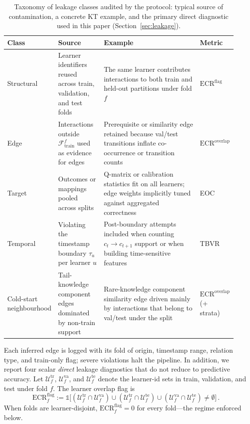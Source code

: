 \documentclass[runningheads]{llncs}
\newcommand{\KC}{knowledge component}
\begin{document}
\begin{table}[!t]
\centering
\caption{Taxonomy of leakage classes audited by the protocol: typical
source of contamination, a concrete KT example, and the primary
direct diagnostic used in this paper (Section~\ref{sec:leakage}).}
\label{tab:leakage-taxonomy}
\footnotesize
\setlength{\tabcolsep}{4pt}
\begin{tabular}{@{}p{0.14\linewidth} p{0.20\linewidth} p{0.44\linewidth} p{0.16\linewidth}@{}}
\toprule
Class & Source & Example & Metric \\
\midrule
Structural &
Learner identifiers reused across train, validation, and test folds &
The same learner contributes interactions to both train and held-out partitions under fold $f$ &
$\mathrm{ECR}^{\mathrm{flag}}$ \\
Edge &
Interactions outside $\mathcal{F}_{\text{train}}^f$ used as evidence for edges &
Prerequisite or similarity edge retained because val/test transitions inflate co-occurrence or transition counts &
$\mathrm{ECR}^{\mathrm{overlap}}$ \\
Target &
Outcomes or mappings pooled across splits &
Q-matrix or calibration statistics fit on all learners; edge weights implicitly tuned against aggregated correctness &
EOC \\
Temporal &
Violating the timestamp boundary $\tau_u$ per learner $u$ &
Post-boundary attempts included when counting $c_t\!\to\!c_{t+1}$ support or when building time-sensitive features &
TBVR \\
Cold-start neighbourhood &
Tail-\KC{} edges dominated by non-train support &
Rare-\KC{} similarity edge driven mainly by interactions that belong to val/test under the split &
$\mathrm{ECR}^{\mathrm{overlap}}$ (+ strata) \\
\bottomrule
\end{tabular}
\end{table}

Each inferred edge is logged with its fold of origin, timestamp range,
relation type, and train-only flag; severe violations halt the pipeline.
In addition, we report four scalar \emph{direct} leakage diagnostics that do
not reduce to predictive accuracy. Let $\mathcal{U}^{\mathrm{tr}}_f$,
$\mathcal{U}^{\mathrm{va}}_f$, and $\mathcal{U}^{\mathrm{te}}_f$ denote the
learner-id sets in train, validation, and test under fold $f$. The learner overlap flag is
\begin{equation}
\mathrm{ECR}^{\mathrm{flag}}_f := \mathbb{1}\big[
(\mathcal{U}^{\mathrm{tr}}_f \cap \mathcal{U}^{\mathrm{va}}_f) \cup
(\mathcal{U}^{\mathrm{tr}}_f \cap \mathcal{U}^{\mathrm{te}}_f) \cup
(\mathcal{U}^{\mathrm{va}}_f \cap \mathcal{U}^{\mathrm{te}}_f)
\neq \emptyset
\big]\,.
\label{eq:ecr-flag}
\end{equation}
When folds are learner-disjoint, $\mathrm{ECR}^{\mathrm{flag}}_f=0$ for every fold---the regime enforced below.
\end{document}
